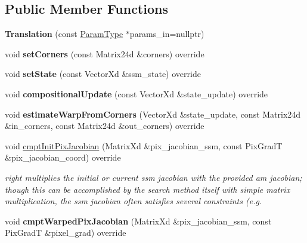 \subsection*{Public Member Functions}
\begin{DoxyCompactItemize}
\item 
\hypertarget{classTranslation_a09a7b0ce5209545f661e4c4063432a4d}{{\bfseries Translation} (const \hyperlink{structTranslationParams}{Param\-Type} $\ast$params\-\_\-in=nullptr)}\label{classTranslation_a09a7b0ce5209545f661e4c4063432a4d}

\item 
\hypertarget{classTranslation_ae326659292b88b1e889bcfcacd3a2f38}{void {\bfseries set\-Corners} (const Matrix24d \&corners) override}\label{classTranslation_ae326659292b88b1e889bcfcacd3a2f38}

\item 
\hypertarget{classTranslation_a7b999c4345abb1b8c4f13590bce14d88}{void {\bfseries set\-State} (const Vector\-Xd \&ssm\-\_\-state) override}\label{classTranslation_a7b999c4345abb1b8c4f13590bce14d88}

\item 
\hypertarget{classTranslation_a51e3ef26d004dcde6305fa05993b3550}{void {\bfseries compositional\-Update} (const Vector\-Xd \&state\-\_\-update) override}\label{classTranslation_a51e3ef26d004dcde6305fa05993b3550}

\item 
\hypertarget{classTranslation_a7624488d7fb888990d085e82ede80bdb}{void {\bfseries estimate\-Warp\-From\-Corners} (Vector\-Xd \&state\-\_\-update, const Matrix24d \&in\-\_\-corners, const Matrix24d \&out\-\_\-corners) override}\label{classTranslation_a7624488d7fb888990d085e82ede80bdb}

\item 
void \hyperlink{classTranslation_a636f8ce8dd8d4d72c2f110a2aeef7fc9}{cmpt\-Init\-Pix\-Jacobian} (Matrix\-Xd \&pix\-\_\-jacobian\-\_\-ssm, const Pix\-Grad\-T \&pix\-\_\-jacobian\-\_\-coord) override
\begin{DoxyCompactList}\small\item\em right multiplies the initial or current ssm jacobian with the provided am jacobian; though this can be accomplished by the search method itself with simple matrix multiplication, the ssm jacobian often satisfies several constraints (e.\-g. \end{DoxyCompactList}\item 
\hypertarget{classTranslation_ab630660abe7bb37133d48b803f86fb01}{void {\bfseries cmpt\-Warped\-Pix\-Jacobian} (Matrix\-Xd \&pix\-\_\-jacobian\-\_\-ssm, const Pix\-Grad\-T \&pixel\-\_\-grad) override}\label{classTranslation_ab630660abe7bb37133d48b803f86fb01}


\end{DoxyCompactItemize}
